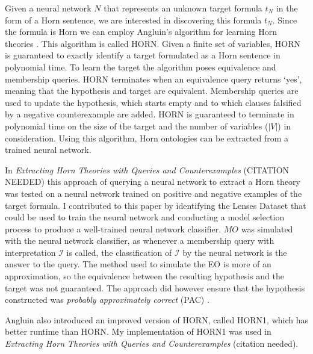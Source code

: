 Given a neural network $N$ that represents an unknown target formula $t_N$ in the form of a Horn sentence, we are interested in discovering this formula $t_N$. Since the formula is Horn we can employ Angluin's algorithm for learning Horn theories \cite{DBLP:journals/ml/AngluinFP92}. This algorithm is called HORN. Given a finite set of variables, HORN is guaranteed to exactly identify a target formulated as a Horn sentence in polynomial time. To learn the target the algorithm poses equivalence and membership queries. HORN terminates when an equivalence query returns `yes', meaning that the hypothesis and target are equivalent. Membership queries are used to update the hypothesis, which starts empty and to which clauses falsified by a negative counterexample are added. HORN is guaranteed to terminate in polynomial time on the size of the target and the number of variables ($|V|$) in consideration. Using this algorithm, Horn ontologies can be extracted from a trained neural network.

In \emph{Extracting Horn Theories with Queries and Counterexamples} (CITATION NEEDED) this approach of querying a neural network to extract a Horn theory was tested on a neural network trained on positive and negative examples of the target formula. I contributed to this paper by identifying the Lenses Dataset \cite{todo} that could be used to train the neural network and conducting a model selection process to produce a well-trained neural network classifier. $MO$ was simulated with the neural network classifier, as whenever a membership query with interpretation $\mathcal{I}$ is called, the classification of $\mathcal{I}$ by the neural network is the answer to the query. The method used to simulate the EO is more of an approximation, so the equivalence between the resulting hypothesis and the target was not guaranteed. The approach did however ensure that the hypothesis constructed was \emph{probably approximately correct} (PAC) \cite{Valiant}.

Angluin also introduced an improved version of HORN, called HORN1, which has better runtime than HORN. My implementation of HORN1 was used in \emph{Extracting Horn Theories with Queries and Counterexamples} (citation needed).

